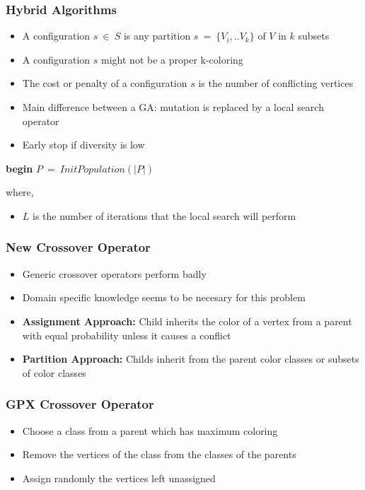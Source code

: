 \documentclass{beamer}
\begin{document}
\begin{frame}
\frametitle{Hybrid Algorithms}
\begin{multicols}{2}
\begin{itemize}
\item A configuration $s\ \in\ S$ is any partition $s\ =\ \{V_i,..V_k\}$ of $V$ in $k$ subsets
\item A configuration $s$ might not be a proper k-coloring
\item The cost or penalty of a configuration $s$ is the number of conflicting vertices
\item Main difference between a GA: mutation is replaced by a local search operator
\item Early stop if diversity is low
\end{itemize}
\columnbreak
\small{
\begin{algorithm}[H]
{\bf begin}\;
$P\ =\ InitPopulation(|P|)$\;
\end{algorithm}
}
where,
\begin{itemize}
\item $L$ is the number of iterations that the local search will perform
\end{itemize}
\end{multicols}
\end{frame}

\begin{frame}
\frametitle{New Crossover Operator}
\begin{itemize}
\item Generic crossover operators perform badly
\item Domain specific knowledge seems to be necesary for this problem
\item {\bf Assignment Approach:} Child inherits the color of a vertex from a parent with equal probability unless it causes a conflict
\item {\bf Partition Approach:} Childs inherit from the parent color classes or subsets of color classes
\end{itemize}

\end{frame}

\begin{frame}
\frametitle{GPX Crossover Operator}
\begin{itemize}
\item Choose a class from a parent which has maximum coloring
\item Remove the vertices of the class from the classes of the parents
\item Assign randomly the vertices left unassigned
\end{itemize}
\end{frame}
\end{document}
